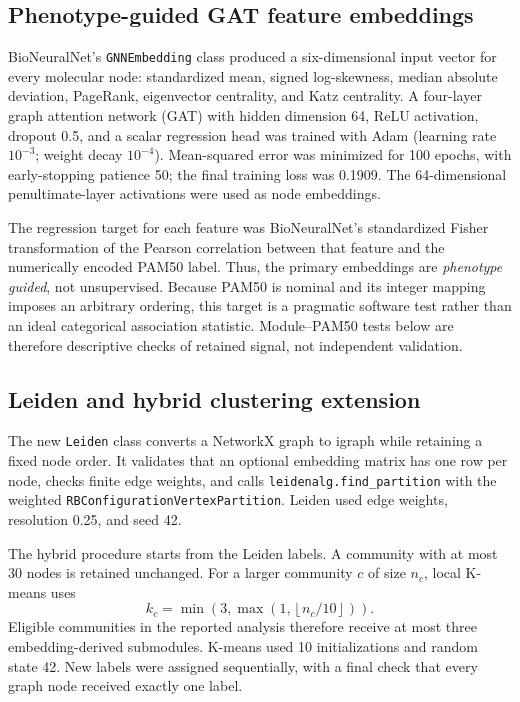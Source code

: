 \documentclass[11pt]{article}
\begin{document}
\subsection{Phenotype-guided GAT feature embeddings}

BioNeuralNet's \texttt{GNNEmbedding} class produced a six-dimensional input vector for every molecular node: standardized mean, signed log-skewness, median absolute deviation, PageRank, eigenvector centrality, and Katz centrality. A four-layer graph attention network (GAT) \cite{velickovic2018} with hidden dimension 64, ReLU activation, dropout 0.5, and a scalar regression head was trained with Adam (learning rate $10^{-3}$; weight decay $10^{-4}$). Mean-squared error was minimized for 100 epochs, with early-stopping patience 50; the final training loss was 0.1909. The 64-dimensional penultimate-layer activations were used as node embeddings.

The regression target for each feature was BioNeuralNet's standardized Fisher transformation of the Pearson correlation between that feature and the numerically encoded PAM50 label. Thus, the primary embeddings are \emph{phenotype guided}, not unsupervised. Because PAM50 is nominal and its integer mapping imposes an arbitrary ordering, this target is a pragmatic software test rather than an ideal categorical association statistic. Module--PAM50 tests below are therefore descriptive checks of retained signal, not independent validation.

\subsection{Leiden and hybrid clustering extension}

The new \texttt{Leiden} class converts a NetworkX graph to igraph while retaining a fixed node order. It validates that an optional embedding matrix has one row per node, checks finite edge weights, and calls \texttt{leidenalg.find\_partition} with the weighted \texttt{RBConfigurationVertexPartition}. Leiden used edge weights, resolution 0.25, and seed 42.

The hybrid procedure starts from the Leiden labels. A community with at most 30 nodes is retained unchanged. For a larger community $c$ of size $n_c$, local K-means uses
\begin{equation}
k_c=\min\left(3,\max\left(1,\left\lfloor n_c/10\right\rfloor\right)\right).
\end{equation}
Eligible communities in the reported analysis therefore receive at most three embedding-derived submodules. K-means used 10 initializations and random state 42. New labels were assigned sequentially, with a final check that every graph node received exactly one label.
\end{document}
